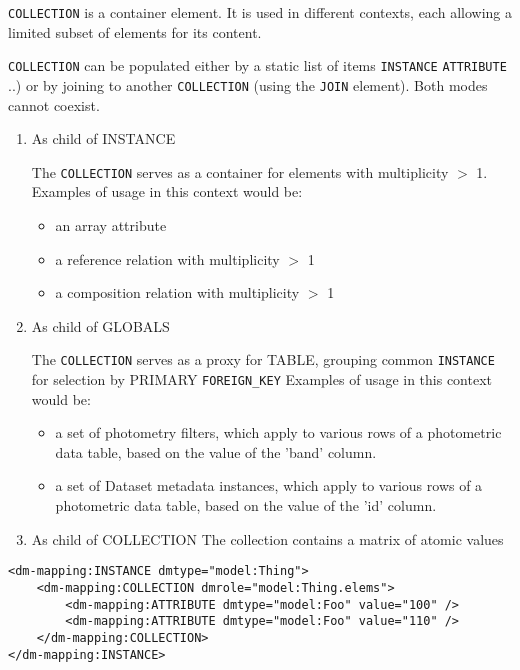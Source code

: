     \texttt{COLLECTION} is a container element.  It is used in different contexts, each allowing a limited subset of elements for its content. 
    
    \texttt{COLLECTION} can be populated either by a static list of items  \texttt{INSTANCE}  \texttt{ATTRIBUTE} ..) or by joining to another \texttt{COLLECTION} (using the \texttt{JOIN} element). Both  modes cannot coexist.
    
    \begin{enumerate}
    \item{As child of INSTANCE}
      
      The \texttt{COLLECTION} serves as a container for elements with multiplicity $>$ 1.\\
      Examples of usage in this context would be:
      \begin{itemize}
        \item an array attribute
        \item a reference relation with multiplicity $>$ 1
        \item a composition relation with multiplicity $>$ 1
      \end{itemize}
      
    \item{As child of GLOBALS}
          
      The \texttt{COLLECTION} serves as a proxy for TABLE, grouping common \texttt{INSTANCE}  for selection by PRIMARY \texttt{FOREIGN\_KEY} 
      Examples of usage in this context would be:
      \begin{itemize}
        \item a set of photometry filters, which apply to various rows of a photometric data table, based on the value of the 'band' column.
        \item a set of Dataset metadata instances, which apply to various rows of a photometric data table, based on the value of the 'id' column.
      \end{itemize}
          
    \item{As child of COLLECTION}
	The collection contains a matrix of  atomic values
        
    \end{enumerate}
   
\begin{lstlisting}[frame=single,caption={Example of \texttt{COLLECTION} child of INSTANCE},style=XML,basicstyle=\tiny]
<dm-mapping:INSTANCE dmtype="model:Thing">
    <dm-mapping:COLLECTION dmrole="model:Thing.elems">
        <dm-mapping:ATTRIBUTE dmtype="model:Foo" value="100" />
        <dm-mapping:ATTRIBUTE dmtype="model:Foo" value="110" />
    </dm-mapping:COLLECTION>
</dm-mapping:INSTANCE>
\end{lstlisting}   

